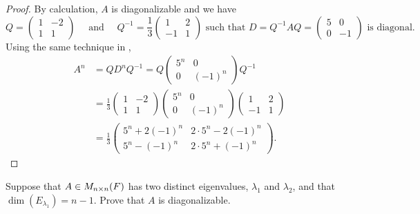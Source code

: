 \begin{proof}
By calculation, \(A\) is diagonalizable and we have
\[
    Q = \begin{pmatrix}
        1 & -2 \\ 1 & 1
    \end{pmatrix}
    \quad \text{ and } \quad
    Q^{-1} = \frac{1}{3} \begin{pmatrix}
        1 & 2 \\ -1 & 1
    \end{pmatrix}
    \text{ such that } D = Q^{-1} A Q = \begin{pmatrix} 5 & 0 \\ 0 & -1 \end{pmatrix} \text{ is diagonal}.
\]
Using the same technique in ,
\begin{align*}
    A^n & = Q D^n Q^{-1} = Q \begin{pmatrix}
        5^n & 0 \\ 0 & (-1)^n
    \end{pmatrix} Q^{-1} \\
        & = \frac{1}{3}
            \begin{pmatrix} 1 & -2 \\ 1 & 1 \end{pmatrix}
            \begin{pmatrix} 5^n & 0 \\ 0 & (-1)^n \end{pmatrix}
            \begin{pmatrix} 1 & 2 \\ -1 & 1 \end{pmatrix} \\
        & = \frac{1}{3} \begin{pmatrix}
                5^n + 2(-1)^n & 2 \cdot 5^n - 2(-1)^n \\
                5^n - (-1)^n & 2 \cdot 5^n + (-1)^n
        \end{pmatrix}.
\end{align*}
\end{proof}

\begin{exercise} \label{exercise 5.2.8}
Suppose that \(A \in M_{n \times n}(F)\) has two distinct eigenvalues, \(\lambda_1\) and \(\lambda_2\), and that \(\dim(E_{\lambda_1})
= n - 1\).
Prove that \(A\) is diagonalizable.
\end{exercise}

